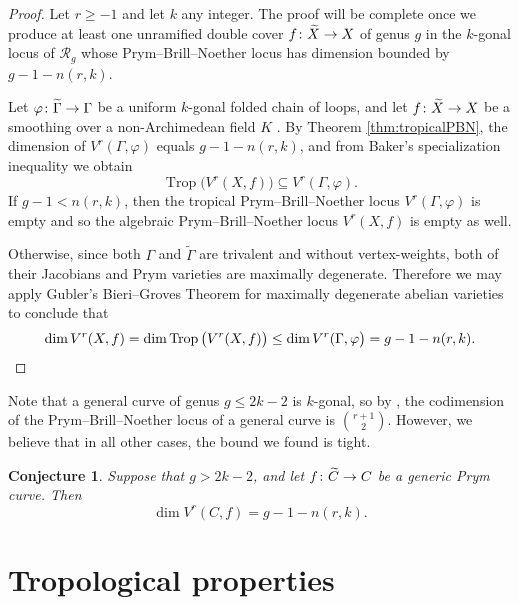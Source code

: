 \documentclass[11pt,reqno]{amsart}
\newcommand*{\cR}{\mathcal{R}}
\newcommand*{\maps}{\nobreak\mskip2mu\mathpunct{}\nonscript
  \mkern-\thinmuskip{:}\mskip6muplus1mu\relax}
\newcommand*{\wti}[1]{\widetilde{#1}}
\DeclareMathOperator{\trop}{Trop}
\theoremstyle{definition}
\theoremstyle{problem}
\theoremstyle{plain}
\newtheorem{conjecture}[definition]{Conjecture}
\theoremstyle{remark}
\theoremstyle{theorem}
\numberwithin{equation}{section}
\numberwithin{figure}{section}
\begin{document}
\algebraicPBN*
\begin{proof}
  Let $r\geq -1$ and let $k$ any integer.  The proof will be complete
  once we produce at least one unramified double cover
  $f \maps \wti{X} \to X$ of genus $g$ in the $k$-gonal locus of
  $\cR_g$ whose Prym--Brill--Noether locus has dimension bounded by
  $g-1-n(r,k)$.
  
  Let $\varphi\maps\wti\Gamma\rightarrow \Gamma$ be a uniform
  $k$-gonal folded chain of loops, and let
  $f\maps \wti{X}\rightarrow X$ be a smoothing over a non-Archimedean
  field $K$ \cite[Lemma~7.0.1]{len2019skeletons}.  By Theorem
  \ref{thm:tropicalPBN}, the dimension of $V^r(\Gamma,\varphi)$ equals
  $g-1-n(r,k)$, and from Baker's specialization inequality
  \cite[Corollary 2.11]{Baker_specialization} we obtain
  \begin{equation*}
  \trop\big(V^r(X,f)\big) \subseteq V^r(\Gamma,\varphi).
  \end{equation*} 
  If $g-1<n(r,k)$, then the tropical Prym--Brill--Noether locus $V^r(\Gamma,\varphi)$ is empty and so the algebraic Prym--Brill--Noether locus  $V^{r}(X,f)$ is empty as well.   
  
  Otherwise, since both $\Gamma$ and $\wti\Gamma$ are trivalent and without vertex-weights, both of their Jacobians and  Prym varieties are maximally degenerate. Therefore we may apply Gubler's Bieri--Groves Theorem for maximally degenerate abelian varieties  \cite[Theorem 6.9]{Gubler_trop&nonArch} to conclude that 
  \begin{equation*}
  \dim V^r(X,f)=\dim \trop\big(V^r(X,f)\big)\leq \dim V^r(\Gamma,\varphi\big)=g-1-n(r,k).\qedhere
  \end{equation*}
\end{proof}

Note that a general curve of genus $g\leq 2k-2$ is $k$-gonal, so by \cite{Welters_Prym}, the codimension of the Prym--Brill--Noether locus of a general curve is $\binom{r+1}{2}$. However, we believe that in all other cases, the bound we found is tight. 
\begin{conjecture}
  Suppose that $g> 2k-2$, and let  $f\maps\wti{C}\to C$ be a generic Prym curve. Then 
  \[
  \dim V^r(C,f) = g-1-n(r,k).
  \]
\end{conjecture}

\section{Tropological properties}\label{sec:trop-results}
\end{document}
